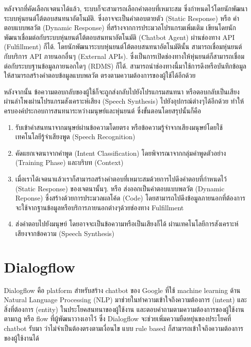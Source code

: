 หลังจากที่คัดเลือกเจตนาได้แล้ว, ระบบก็จะสามารถเลือกคำตอบที่เหมาะสม ซึ่งกำหนดไว้โดยนักพัฒนาระบบหุ่นยนต์โต้ตอบสนทนาอัตโนมัติ. ซึ่งอาจจะเป็นคำตอบตายตัว (Static Response) หรือ คำตอบแบบพลวัต (Dynamic Response) ที่สร้างจากการประมวลโปรแกรมเพิ่มเติม เขียนโดยนักพัฒนาเชื่อมต่อกับระบบหุ่นยนต์โต้ตอบสนทนาอัตโนมัติ (Chatbot Agent) ผ่านช่องทาง API (Fulfillment) ก็ได้. โดยนักพัฒนาระบบหุ่นยนต์โต้ตอบสนทนาอัตโนมัตินั้น สามารถเชื่อมหุ่นยนต์กับบริการ API ภายนอกอื่นๆ (External APIs). ซึ่งเป็นการเปิดช่องทางให้หุ่นยนต์ก็สามารถเชื่อมต่อกับระบบฐานข้อมูลภายนอกใดๆ (RDMS) ก็ได้. สามารถนำช่องทางนี้มาใช้การดึงหรือบันทึกข้อมูล ให้สามารถสร้างคำตอบข้อมูลแบบพลวัต ตรงตามความต้องการของผู้ใช้ได้อีกด้วย

หลังจากนั้น ข้อความตอบกลับของผู้ใช้ก็จะถูกส่งกลับไปยังโปรแกรมสนทนา หรือตอบกลับเป็นเสียงผ่านลำโพงผ่านโปรแกรมสังเคราะห์เสียง (Speech Synthesis) ไปยังอุปกรณ์ต่างๆได้อีกด้วย ทำให้ครบองค์ประกอบการสนทนาระหว่างมนุษย์และหุ่นยนต์ ซึ่งขั้นตอนโดยสรุปนั้นก็คือ

\begin{enumerate}
	\item รับเข้าคำสนทนาจากมนุษย์ผ่านข้อความโดยตรง หรือข้อความรู้จำจากเสียงมนุษย์โดยใช้เทคโนโลยีรู้จำเสียงพูด (Speech Recognition)
	\item คัดแยกเจตนาจากคำพูด (Intent Classification) โดยพิจารณาจากกลุ่มคำพูดตัวอย่าง (Training Phase) และบริบท (Context)
	\item เมื่อเราได้เจตนาแล้วเราก็สามารถสร้างคำตอบที่เหมาะสมด้วยการไปดึงคำตอบที่กำหนดไว้ (Static Response) ของเจตนานั้นๆ. หรือ ส่งออกเป็นคำตอบแบบพลวัต (Dynamic Reponse) ซึ่งสร้างด้วยการประมวลผลโค้ด (Code) โดยสามารถไปดึงข้อมูลภายนอกที่ต้องการจะใช้จากฐานข้อมูลหรือบริการภายนอกต่างๆด้วยช่องทาง Fulfillment
	\item ส่งคำตอบไปยังมนุษย์ โดยอาจจะเป็นข้อความหรือเป็นเสียงก็ได้ ผ่านเทคโนโลยีการสังเคราะห์เสียงจากข้อความ (Speech Synthesis)
\end{enumerate}

\section{Dialogflow}
Dialogflow คือ platform สำหรับสร้าง chatbot ของ Google ที่ใช้ machine learning ด้าน Natural Language Processing (NLP) มาช่วยในทำความเข้าใจถึงความต้องการ (intent) และสิ่งที่ต้องการ (entity) ในประโยคสนทนาของผู้ใช้งาน และตอบคำถามตามความต้องการของผู้ใช้งาน ตามกฎ หรือ flow ที่ผู้พัฒนาวางเอาไว้ ซึ่ง Dialogflow จะช่วยเพิ่มความยืดหยุ่นของประโยคที่ chatbot รับมา ว่าไม่จำเป็นต้องตรงตามเงื่อนไข แบบ rule based ก็สามารถเข้าใจถึงความต้องการของผู้ใช้งานได้


